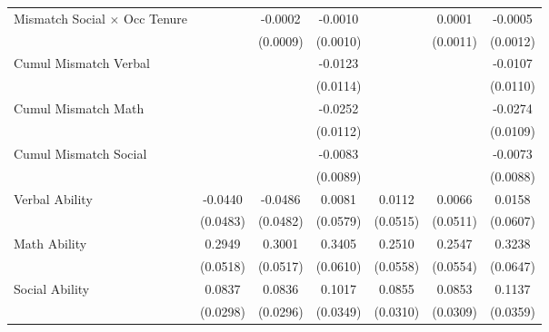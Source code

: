 {\begin{longtable}{l*{6}{c}}
Mismatch Social $\times$ Occ Tenure&                     &     -0.0002         &     -0.0010         &                     &      0.0001         &     -0.0005         \\
                    &                     &    (0.0009)         &    (0.0010)         &                     &    (0.0011)         &    (0.0012)         \\
Cumul Mismatch Verbal&                     &                     &     -0.0123         &                     &                     &     -0.0107         \\
                    &                     &                     &    (0.0114)         &                     &                     &    (0.0110)         \\
Cumul Mismatch Math &                     &                     &     -0.0252\sym{**} &                     &                     &     -0.0274\sym{**} \\
                    &                     &                     &    (0.0112)         &                     &                     &    (0.0109)         \\
Cumul Mismatch Social&                     &                     &     -0.0083         &                     &                     &     -0.0073         \\
                    &                     &                     &    (0.0089)         &                     &                     &    (0.0088)         \\
Verbal Ability      &     -0.0440         &     -0.0486         &      0.0081         &      0.0112         &      0.0066         &      0.0158         \\
                    &    (0.0483)         &    (0.0482)         &    (0.0579)         &    (0.0515)         &    (0.0511)         &    (0.0607)         \\
Math Ability        &      0.2949\sym{***}&      0.3001\sym{***}&      0.3405\sym{***}&      0.2510\sym{***}&      0.2547\sym{***}&      0.3238\sym{***}\\
                    &    (0.0518)         &    (0.0517)         &    (0.0610)         &    (0.0558)         &    (0.0554)         &    (0.0647)         \\
Social Ability      &      0.0837\sym{***}&      0.0836\sym{***}&      0.1017\sym{***}&      0.0855\sym{***}&      0.0853\sym{***}&      0.1137\sym{***}\\
                    &    (0.0298)         &    (0.0296)         &    (0.0349)         &    (0.0310)         &    (0.0309)         &    (0.0359)         \\

\end{longtable}}
